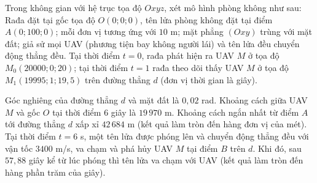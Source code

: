 \begin{ex}
Trong không gian với hệ trục tọa độ $Oxyz$, xét mô hình phòng không như sau: Rađa đặt tại gốc tọa độ $O(0;0;0)$, tên lửa phòng không đặt tại điểm $A(0;100;0)$; mỗi đơn vị tương ứng với $10$ m; mặt phẳng $(Oxy)$ trùng với mặt đất; giả sử mọi UAV (phương tiện bay không người lái) và tên lửa đều chuyển động thẳng đều. Tại thời điểm $t=0$, rađa phát hiện ra UAV $M$ ở tọa độ $M_0(20000;0;20)$; tại thời điểm $t=1$ rađa theo dõi thấy UAV $M$ ở tọa độ $M_1(19995;1;19{,}5)$ trên đường thẳng $d$ (đơn vị thời gian là giây).
\begin{center}
\end{center}
\choiceTF
{Góc nghiêng của đường thẳng $d$ và mặt đất là $0{,}02$ rad.}
{Khoảng cách giữa UAV $M$ và gốc $O$ tại thời điểm $6$ giây là $19\,970$ m.}
{\True Khoảng cách ngắn nhất từ điểm $A$ tới đường thẳng $d$ xấp xỉ $42\,684$ m (kết quả làm tròn đến hàng đơn vị của mét).}
{\True Tại thời điểm $t=6$ s, một tên lửa được phóng lên và chuyển động thẳng đều với vận tốc $3400$ m/s, va chạm và phá hủy UAV $M$ tại điểm $B$ trên $d$. Khi đó, sau $57{,}88$ giây kể từ lúc phóng thì tên lửa va chạm với UAV (kết quả làm tròn đến hàng phần trăm của giây).}
\end{ex}
